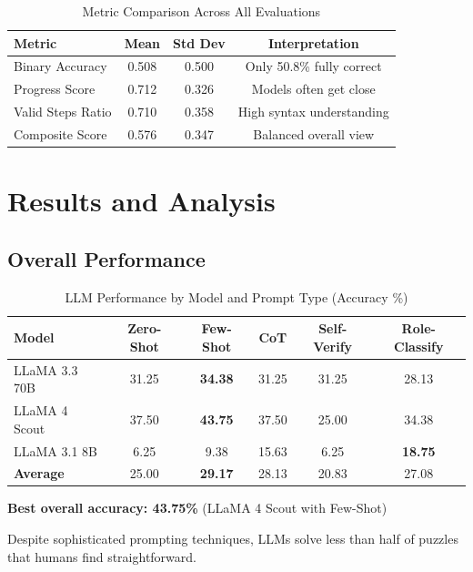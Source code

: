 \documentclass[11pt,a4paper]{article}
\begin{document}
\begin{table}[H]
\centering
\caption{Metric Comparison Across All Evaluations}
\begin{tabular}{lccc}
\toprule
\textbf{Metric} & \textbf{Mean} & \textbf{Std Dev} & \textbf{Interpretation} \\
\midrule
Binary Accuracy & 0.508 & 0.500 & Only 50.8\% fully correct \\
Progress Score & 0.712 & 0.326 & Models often get close \\
Valid Steps Ratio & 0.710 & 0.358 & High syntax understanding \\
Composite Score & 0.576 & 0.347 & Balanced overall view \\
\bottomrule
\end{tabular}
\end{table}

\section{Results and Analysis}

\subsection{Overall Performance}

\begin{table}[H]
\centering
\caption{LLM Performance by Model and Prompt Type (Accuracy \%)}
\begin{tabular}{lccccc}
\toprule
\textbf{Model} & \textbf{Zero-Shot} & \textbf{Few-Shot} & \textbf{CoT} & \textbf{Self-Verify} & \textbf{Role-Classify} \\
\midrule
LLaMA 3.3 70B & 31.25 & \textbf{34.38} & 31.25 & 31.25 & 28.13 \\
LLaMA 4 Scout & 37.50 & \textbf{43.75} & 37.50 & 25.00 & 34.38 \\
LLaMA 3.1 8B & 6.25 & 9.38 & 15.63 & 6.25 & \textbf{18.75} \\
\midrule
\textbf{Average} & 25.00 & \textbf{29.17} & 28.13 & 20.83 & 27.08 \\
\bottomrule
\end{tabular}
\end{table}

\begin{tcolorbox}[colback=red!5,colframe=red!50!black,title=Key Finding]
\textbf{Best overall accuracy: 43.75\%} (LLaMA 4 Scout with Few-Shot)

Despite sophisticated prompting techniques, LLMs solve less than half of puzzles that humans find straightforward.
\end{tcolorbox}
\end{document}
